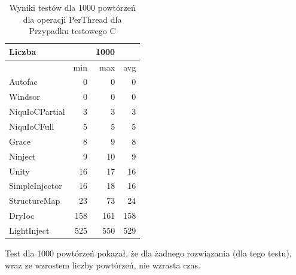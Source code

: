 \documentclass[12pt]{article}
\begin{document}
\begin{table}[H]
\captionsetup{belowskip=0pt,aboveskip=0pt}
\begin{center}
\begin{small}
	\begin{tabular}{ | l | r r r | }
    		\hline
Liczba & & 1000 & \\ \hline
 & min & max & avg \\ \hline
Autofac & 0 & 0 & 0 \\ \hline
Windsor & 0 & 0 & 0 \\ \hline
NiquIoCPartial & 3 & 3 & 3 \\ \hline
NiquIoCFull & 5 & 5 & 5 \\ \hline
Grace & 8 & 9 & 8 \\ \hline
Ninject & 9 & 10 & 9 \\ \hline
Unity & 16 & 17 & 16 \\ \hline
SimpleInjector & 16 & 18 & 16 \\ \hline
StructureMap & 23 & 73 & 24 \\ \hline
DryIoc & 158 & 161 & 158 \\ \hline
LightInject & 525 & 550 & 529 \\ \hline
  	\end{tabular}
\end{small}
\end{center}
\caption{Wyniki testów dla 1000 powtórzeń dla operacji PerThread dla Przypadku testowego C}
\label{TestCaseC_PerThread1000}
\end{table}
Test dla 1000 powtórzeń pokazał, że dla żadnego rozwiązania (dla tego testu), wraz ze wzrostem liczby powtórzeń, nie wzrasta czas.
\end{document}
